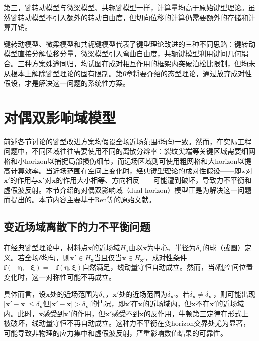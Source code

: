 第三，键转动模型与微梁模型、共轭键模型一样，计算量均高于原始键型理论。虽然键转动模型不引入额外的转动自由度，但切向位移的计算仍需要额外的存储和计算开销。

\begin{remark}
  键转动模型、微梁模型和共轭键模型代表了键型理论改进的三种不同思路：键转动模型直接分解位移分量，微梁模型引入弯曲自由度，共轭键模型利用键间几何耦合。三种方案殊途同归，均试图在成对相互作用的框架内突破泊松比限制，但均未从根本上解除键型理论的固有限制。第6章将要介绍的态型理论，通过放弃成对性假设，才是解决这一问题的系统性方案。
\end{remark}


\section{对偶双影响域模型}\label{sec:dual-horizon}

前述各节讨论的键型改进方案均假设全场近场范围$\delta$均匀一致。然而，在实际工程问题中，不同区域往往需要使用不同的离散分辨率：裂纹尖端等关键区域需要细网格和小horizon以捕捉局部损伤细节，而远场区域则可使用粗网格和大horizon以提高计算效率。当近场范围在空间上变化时，经典键型理论的成对性假设——即$\mathbf{x}$对$\mathbf{x}'$的作用与$\mathbf{x}'$对$\mathbf{x}$的作用大小相等、方向相反——可能遭到破坏，导致力不平衡和虚假波反射。本节介绍的对偶双影响域（dual-horizon）模型正是为解决这一问题而提出的。本节内容主要基于Ren等\cite{Ren2017dualhorizon}的原始文献。

\subsection{变近场域离散下的力不平衡问题}\label{sec:dh-issue}

在经典键型理论中，材料点$\mathbf{x}$的近场域$H_{\mathbf{x}}$由以$\mathbf{x}$为中心、半径为$\delta_{\mathbf{x}}$的球（或圆）定义。若全场$\delta$均匀，则$\mathbf{x}'\in H_{\mathbf{x}}$当且仅当$\mathbf{x}\in H_{\mathbf{x}'}$，成对性条件$\mathbf{f}(-\boldsymbol{\eta},-\boldsymbol{\xi})=-\mathbf{f}(\boldsymbol{\eta},\boldsymbol{\xi})$自然满足，线动量守恒自动成立。然而，当$\delta$随空间位置变化时，这一对称性可能不再成立。

具体而言，设$\mathbf{x}$处的近场范围为$\delta_{\mathbf{x}}$，$\mathbf{x}'$处的近场范围为$\delta_{\mathbf{x}'}$。若$\delta_{\mathbf{x}}\neq\delta_{\mathbf{x}'}$，则可能出现$|\mathbf{x}'-\mathbf{x}|\le\delta_{\mathbf{x}}$但$|\mathbf{x}'-\mathbf{x}|>\delta_{\mathbf{x}'}$的情况，即$\mathbf{x}'$在$\mathbf{x}$的近场域内，但$\mathbf{x}$不在$\mathbf{x}'$的近场域内。此时，$\mathbf{x}$感受到$\mathbf{x}'$的作用，但$\mathbf{x}'$感受不到$\mathbf{x}$的反作用，牛顿第三定律在形式上被破坏，线动量守恒不再自动成立。这种力不平衡在变horizon交界处尤为显著，可能导致非物理的应力集中和虚假波反射，严重影响数值结果的可靠性。

